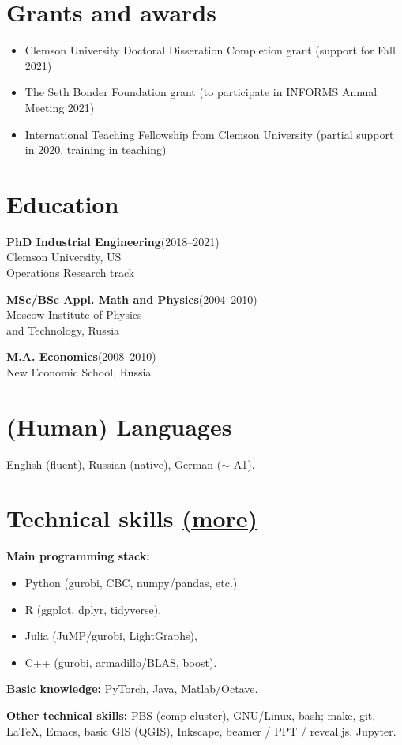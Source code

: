 \documentclass[11pt]{article} \usepackage{geometry} %
\newcommand{\edu}[3]{
  \textbf{#1}\hfill (#2)\\
  #3\vspace{0.7em}}
\newcommand{\mhref}[1]{\hfill\href{#1}{\small (more\faExternalLink*)}}
\begin{document}
 \section*{Grants and awards}
 \begin{itemize}
 \itemsep0pt 
    \item Clemson University Doctoral Disseration Completion grant (support for Fall 2021)
    \item The Seth Bonder Foundation grant (to participate in INFORMS Annual Meeting 2021)
    \item International Teaching Fellowship from Clemson University (partial
      support in 2020, training in teaching)
 \end{itemize}
 \noindent
 \begin{minipage}[t]{0.49\textwidth}
   \section*{Education} 
   \edu{PhD Industrial Engineering}{2018--2021}{
     Clemson University, US\\
     Operations Research track}

   \edu{MSc/BSc Appl. Math and Physics}{2004--2010}{
     Moscow Institute of Physics\\
     and Technology, Russia}

   \edu{M.A. Economics}{2008--2010}{
   New Economic School, Russia}

\section*{(Human) Languages}
English (fluent), Russian (native), German ($\sim$ A1).

\end{minipage}\hfill%
\begin{minipage}[t]{0.49\textwidth}
   \section*{Technical skills \mhref{https://www.bochkarev.io/notes/stack/}}
   \textbf{Main programming stack:}
   \begin{itemize}
     \itemsep0pt
   \item Python (gurobi, CBC, numpy/pandas, etc.)
     \item R (ggplot, dplyr, tidyverse),
     \item Julia (JuMP/gurobi, LightGraphs),
     \item C++ (gurobi, armadillo/BLAS, boost).
   \end{itemize}\vspace{0.5em}
   \textbf{Basic knowledge:} PyTorch, Java, Matlab/Octave. \vspace{1em}

   \textbf{Other technical skills:}
   PBS (comp cluster), GNU/Linux, bash; make, git, \LaTeX, Emacs, basic GIS
   (QGIS), Inkscape, beamer / PPT / reveal.js, Jupyter.
   \end{minipage}
   \vspace{1em}
\end{document}
